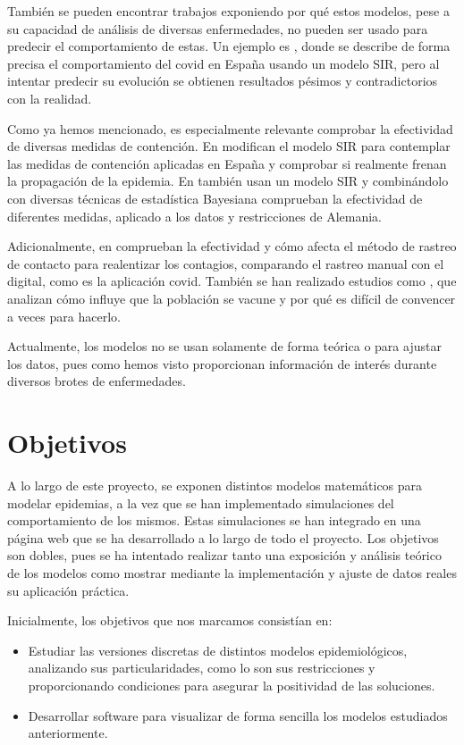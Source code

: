 También se pueden encontrar trabajos exponiendo por qué estos modelos, pese a su capacidad de análisis de diversas enfermedades, no pueden ser usado para predecir el comportamiento de estas. Un ejemplo es \cite{turningpoint}, donde se describe de forma precisa el comportamiento del covid en España usando un modelo SIR, pero al intentar predecir su evolución se obtienen resultados pésimos y contradictorios con la realidad.

Como ya hemos mencionado, es especialmente relevante comprobar la efectividad de diversas medidas de contención. En \cite{gutierrez2020analisis} modifican el modelo SIR para contemplar las medidas de contención aplicadas en España y comprobar si realmente frenan la propagación de la epidemia. En \cite{inferringinterventions} también usan un modelo SIR y combinándolo con diversas técnicas de estadística Bayesiana comprueban la efectividad de diferentes medidas, aplicado a los datos y restricciones de Alemania.

Adicionalmente, en \cite{Mancastroppa2021} comprueban la efectividad y cómo afecta el método de rastreo de contacto para realentizar los contagios, comparando el rastreo manual con el digital, como es la aplicación covid. También se han realizado estudios como \cite{vaccinationproblem}, que analizan cómo influye que la población se vacune y por qué es difícil de convencer a veces para hacerlo.

Actualmente, los modelos no se usan solamente de forma teórica o para ajustar los datos, pues como hemos visto proporcionan información de interés durante diversos brotes de enfermedades.


\section{Objetivos}

A lo largo de este proyecto, se exponen distintos modelos matemáticos para modelar epidemias, a la vez que se han implementado simulaciones del comportamiento de los mismos. Estas simulaciones se han integrado en una página web que se ha desarrollado a lo largo de todo el proyecto. Los objetivos son dobles, pues se ha intentado realizar tanto una exposición y análisis teórico de los modelos como mostrar mediante la implementación y ajuste de datos reales su aplicación práctica.

Inicialmente, los objetivos que nos marcamos consistían en:

\begin{itemize}
\item Estudiar las versiones discretas de distintos modelos epidemiológicos, analizando sus particularidades, como lo son sus restricciones y proporcionando condiciones para asegurar la positividad de las soluciones.
\item Desarrollar software para visualizar de forma sencilla los modelos estudiados anteriormente.
\end{itemize}



